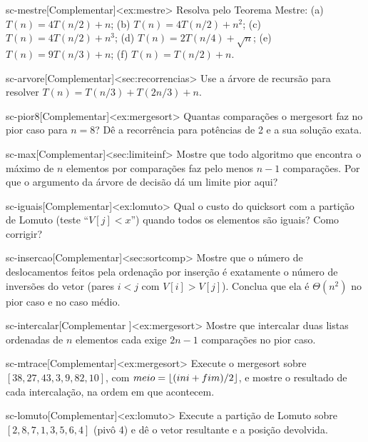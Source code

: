 \excompl
\begin{exercicio}{sc-mestre}[Complementar]<ex:mestre>
Resolva pelo Teorema Mestre: (a) $T(n)=4T(n/2)+n$; (b) $T(n)=4T(n/2)+n^2$; (c) $T(n)=4T(n/2)+n^3$; (d) $T(n)=2T(n/4)+\sqrt n$; (e) $T(n)=9T(n/3)+n$; (f) $T(n)=T(n/2)+n$.
\end{exercicio}
\begin{exercicio}{sc-arvore}[Complementar]<sec:recorrencias>
Use a árvore de recursão para resolver $T(n)=T(n/3)+T(2n/3)+n$.
\end{exercicio}
\begin{exercicio}{sc-pior8}[Complementar]<ex:mergesort>
Quantas comparações o mergesort faz no pior caso para $n=8$? Dê a recorrência para potências de 2 e a sua solução exata.
\end{exercicio}
\begin{exercicio}{sc-max}[Complementar]<sec:limiteinf>
Mostre que todo algoritmo que encontra o máximo de $n$ elementos por comparações faz pelo menos $n-1$ comparações. Por que o argumento da árvore de decisão dá um limite pior aqui?
\end{exercicio}
\begin{exercicio}{sc-iguais}[Complementar]<ex:lomuto>
Qual o custo do quicksort com a partição de Lomuto (teste ``$V[j]<x$'') quando todos os elementos são iguais? Como corrigir?
\end{exercicio}
\begin{exercicio}{sc-insercao}[Complementar]<sec:sortcomp>
Mostre que o número de deslocamentos feitos pela ordenação por inserção é exatamente o número de inversões do vetor (pares $i<j$ com $V[i]>V[j]$). Conclua que ela é $\Theta(n^2)$ no pior caso e no caso médio.
\end{exercicio}
\begin{exercicio}{sc-intercalar}[Complementar \estrela]<ex:mergesort>
Mostre que intercalar duas listas ordenadas de $n$ elementos cada exige $2n-1$ comparações no pior caso.
\end{exercicio}
\begin{exercicio}{sc-mtrace}[Complementar]<ex:mergesort>
Execute o mergesort sobre $[38,27,43,3,9,82,10]$, com $meio=\lfloor(ini+fim)/2\rfloor$, e mostre o resultado de cada intercalação, na ordem em que acontecem.
\end{exercicio}
\begin{exercicio}{sc-lomuto}[Complementar]<ex:lomuto>
Execute a partição de Lomuto sobre $[2,8,7,1,3,5,6,4]$ (pivô 4) e dê o vetor resultante e a posição devolvida.
\end{exercicio}
